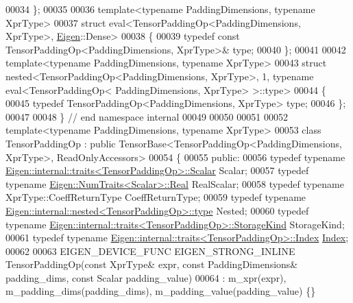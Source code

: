 \begin{DoxyCode}
00034 \};
00035 
00036 \textcolor{keyword}{template}<\textcolor{keyword}{typename} PaddingDimensions, \textcolor{keyword}{typename} XprType>
00037 \textcolor{keyword}{struct }eval<TensorPaddingOp<PaddingDimensions, XprType>, \hyperlink{namespace_eigen}{Eigen}::Dense>
00038 \{
00039   \textcolor{keyword}{typedef} \textcolor{keyword}{const} TensorPaddingOp<PaddingDimensions, XprType>& type;
00040 \};
00041 
00042 \textcolor{keyword}{template}<\textcolor{keyword}{typename} PaddingDimensions, \textcolor{keyword}{typename} XprType>
00043 \textcolor{keyword}{struct }nested<TensorPaddingOp<PaddingDimensions, XprType>, 1, typename eval<TensorPaddingOp<
      PaddingDimensions, XprType> >::type>
00044 \{
00045   \textcolor{keyword}{typedef} TensorPaddingOp<PaddingDimensions, XprType> type;
00046 \};
00047 
00048 \}  \textcolor{comment}{// end namespace internal}
00049 
00050 
00051 
00052 \textcolor{keyword}{template}<\textcolor{keyword}{typename} PaddingDimensions, \textcolor{keyword}{typename} XprType>
00053 \textcolor{keyword}{class }TensorPaddingOp : \textcolor{keyword}{public} TensorBase<TensorPaddingOp<PaddingDimensions, XprType>, ReadOnlyAccessors>
00054 \{
00055   \textcolor{keyword}{public}:
00056   \textcolor{keyword}{typedef} \textcolor{keyword}{typename} \hyperlink{struct_eigen_1_1internal_1_1traits}{Eigen::internal::traits<TensorPaddingOp>::Scalar}
       Scalar;
00057   \textcolor{keyword}{typedef} \textcolor{keyword}{typename} \hyperlink{group___sparse_core___module}{Eigen::NumTraits<Scalar>::Real} RealScalar;
00058   \textcolor{keyword}{typedef} \textcolor{keyword}{typename} XprType::CoeffReturnType CoeffReturnType;
00059   \textcolor{keyword}{typedef} \textcolor{keyword}{typename} \hyperlink{class_eigen_1_1internal_1_1_tensor_lazy_evaluator_writable}{Eigen::internal::nested<TensorPaddingOp>::type}
       Nested;
00060   \textcolor{keyword}{typedef} \textcolor{keyword}{typename} \hyperlink{struct_eigen_1_1internal_1_1traits}{Eigen::internal::traits<TensorPaddingOp>::StorageKind}
       StorageKind;
00061   \textcolor{keyword}{typedef} \textcolor{keyword}{typename} \hyperlink{struct_eigen_1_1internal_1_1traits}{Eigen::internal::traits<TensorPaddingOp>::Index}
       \hyperlink{namespace_eigen_a62e77e0933482dafde8fe197d9a2cfde}{Index};
00062 
00063   EIGEN\_DEVICE\_FUNC EIGEN\_STRONG\_INLINE TensorPaddingOp(\textcolor{keyword}{const} XprType& expr, \textcolor{keyword}{const} PaddingDimensions& 
      padding\_dims, \textcolor{keyword}{const} Scalar padding\_value)
00064       : m\_xpr(expr), m\_padding\_dims(padding\_dims), m\_padding\_value(padding\_value) \{\}

\end{DoxyCode}

